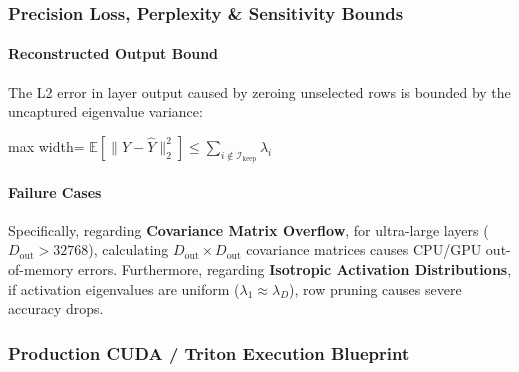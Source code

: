 \subsubsection*{Precision Loss, Perplexity \& Sensitivity Bounds}

\paragraph{Reconstructed Output Bound}

The L2 error in layer output caused by zeroing unselected rows is bounded by the uncaptured eigenvalue variance:

\begin{center}
\begin{adjustbox}{max width=\columnwidth}
$\displaystyle
\mathbb{E}\left[ \| Y - \widehat{Y} \|_2^2 \right] \le \sum_{i \notin \mathcal{I}_{\text{keep}}} \lambda_i
$
\end{adjustbox}
\end{center}

\paragraph{Failure Cases}

Specifically, regarding \textbf{Covariance Matrix Overflow}, for ultra-large layers ($D_{\text{out}} > 32768$), calculating $D_{\text{out}} \times D_{\text{out}}$ covariance matrices causes CPU/GPU out-of-memory errors. Furthermore, regarding \textbf{Isotropic Activation Distributions}, if activation eigenvalues are uniform ($\lambda_1 \approx \lambda_D$), row pruning causes severe accuracy drops.



\subsubsection*{Production CUDA / Triton Execution Blueprint}

